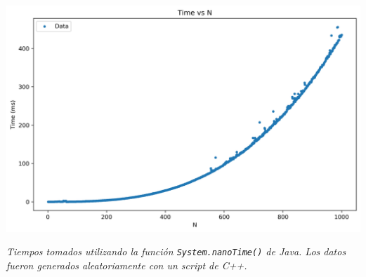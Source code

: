 \documentclass[
]{article}
\begin{document}
\begin{center}
\includegraphics{chart.png}
\end{center}

\emph{Tiempos tomados utilizando la
función \texttt{System.nanoTime()} de Java. Los datos fueron generados
aleatoriamente con un script de C++.}
\end{document}
